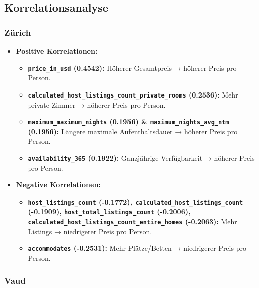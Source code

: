 \documentclass[
  journal,
]{IEEEtran}%
\providecommand{\tightlist}{%
  \setlength{\itemsep}{0pt}\setlength{\parskip}{0pt}}\usepackage{longtable,booktabs,array}
\begin{document}
\hypertarget{korrelationsanalyse-1}{%
\subsection{\texorpdfstring{\textbf{Korrelationsanalyse}}{Korrelationsanalyse}}\label{korrelationsanalyse-1}}

\hypertarget{zuxfcrich}{%
\subsubsection{Zürich}\label{zuxfcrich}}

\begin{itemize}
\item
  \textbf{Positive Korrelationen:}

  \begin{itemize}
  \tightlist
  \item
    \textbf{\texttt{price\_in\_usd} (0.4542):} Höherer Gesamtpreis →
    höherer Preis pro Person.
  \item
    \textbf{\texttt{calculated\_host\_listings\_count\_private\_rooms}
    (0.2536):} Mehr private Zimmer → höherer Preis pro Person.
  \item
    \textbf{\texttt{maximum\_maximum\_nights} (0.1956) \&
    \texttt{maximum\_nights\_avg\_ntm} (0.1956):} Längere maximale
    Aufenthaltsdauer → höherer Preis pro Person.
  \item
    \textbf{\texttt{availability\_365} (0.1922):} Ganzjährige
    Verfügbarkeit → höherer Preis pro Person.
  \end{itemize}
\item
  \textbf{Negative Korrelationen:}

  \begin{itemize}
  \tightlist
  \item
    \textbf{\texttt{host\_listings\_count} (-0.1772),
    \texttt{calculated\_host\_listings\_count} (-0.1909),
    \texttt{host\_total\_listings\_count} (-0.2006),
    \texttt{calculated\_host\_listings\_count\_entire\_homes}
    (-0.2063):} Mehr Listings → niedrigerer Preis pro Person.
  \item
    \textbf{\texttt{accommodates} (-0.2531):} Mehr Plätze/Betten →
    niedrigerer Preis pro Person.
  \end{itemize}
\end{itemize}

\hypertarget{vaud}{%
\subsubsection{Vaud}\label{vaud}}
\end{document}
